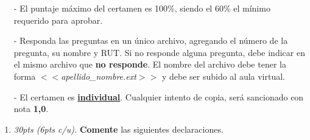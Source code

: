 \documentclass[10pt]{article}
\begin{document}
    {\scriptsize
    \begin{itemize}
        \item[-] El puntaje m\'aximo del certamen es 100\%, siendo el 60\% el m\'inimo requerido para aprobar.
        \item[-] Responda las preguntas en un \'unico archivo, agregando el n\'umero de la pregunta, su nombre y RUT. Si no responde alguna pregunta, debe indicar en el mismo archivo que \textbf{no responde}. El nombre del archivo debe tener la forma $<<$\emph{apellido\_nombre.ext}$>>$ y debe ser subido al aula virtual.
        \item[-] El certamen es \underline{\textbf{individual}}. Cualquier intento de copia, ser\'a sancionado con nota \textbf{1,0}.
    \end{itemize}
    
    \vspace*{-25pt}

    \begin{enumerate}

        \item \emph{30pts (6pts c/u).} \textbf{Comente} las siguientes declaraciones.
    

\end{enumerate}}
\end{document}
